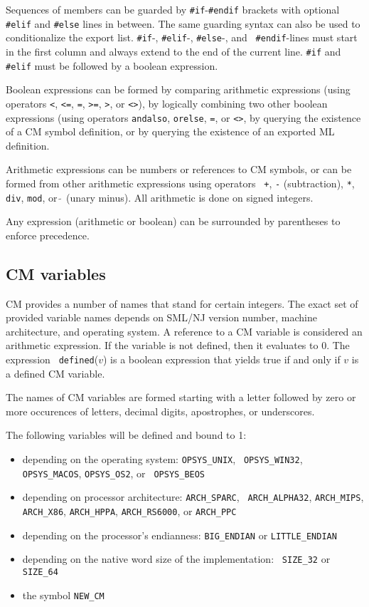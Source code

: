 \documentclass{article}
\begin{document}
Sequences of members can be guarded by {\tt \#if}-{\tt \#endif}
brackets with optional {\tt \#elif} and {\tt \#else} lines in between.
The same guarding syntax can also be used to conditionalize the export
list.  {\tt \#if}-, {\tt \#elif}-, {\tt \#else}-, and {\tt
\#endif}-lines must start in the first column and always
extend to the end of the current line.  {\tt \#if} and {\tt \#elif}
must be followed by a boolean expression.

Boolean expressions can be formed by comparing arithmetic expressions
(using operators {\tt <}, {\tt <=}, {\tt =}, {\tt >=}, {\tt >}, or
{\tt <>}), by logically combining two other boolean expressions (using
operators {\tt andalso}, {\tt orelse}, {\tt =}, or {\tt <>}, by
querying the existence of a CM symbol definition, or by querying the
existence of an exported ML definition.

Arithmetic expressions can be numbers or references to CM symbols, or
can be formed from other arithmetic expressions using operators {\tt
+}, {\tt -} (subtraction), \verb|*|, {\tt div}, {\tt mod}, or $\tilde{~}$
(unary minus).  All arithmetic is done on signed integers.

Any expression (arithmetic or boolean) can be surrounded by
parentheses to enforce precedence.

\subsection{CM variables}
\label{sec:cmvars}

CM provides a number of names that stand for certain integers.  The
exact set of provided variable names depends on SML/NJ version number,
machine architecture, and operating system.  A reference to a CM
variable is considered an arithmetic expression. If the variable is
not defined, then it evaluates to 0.  The expression {\tt
defined}($v$) is a boolean expression that yields true if and only if
$v$ is a defined CM variable.

The names of CM variables are formed starting with a letter followed
by zero or more occurences of letters, decimal digits, apostrophes, or
underscores.

The following variables will be defined and bound to 1:
\begin{itemize}
\item depending on the operating system: {\tt OPSYS\_UNIX}, {\tt
OPSYS\_WIN32}, {\tt OPSYS\_MACOS}, {\tt OPSYS\_OS2}, or {\tt
OPSYS\_BEOS}
\item depending on processor architecture: {\tt ARCH\_SPARC}, {\tt
ARCH\_ALPHA32}, {\tt ARCH\_MIPS}, {\tt ARCH\_X86}, {\tt ARCH\_HPPA},
{\tt ARCH\_RS6000}, or {\tt ARCH\_PPC}
\item depending on the processor's endianness: {\tt BIG\_ENDIAN} or
{\tt LITTLE\_ENDIAN}
\item depending on the native word size of the implementation: {\tt
SIZE\_32} or {\tt SIZE\_64}
\item the symbol {\tt NEW\_CM}
\end{itemize}
\end{document}
